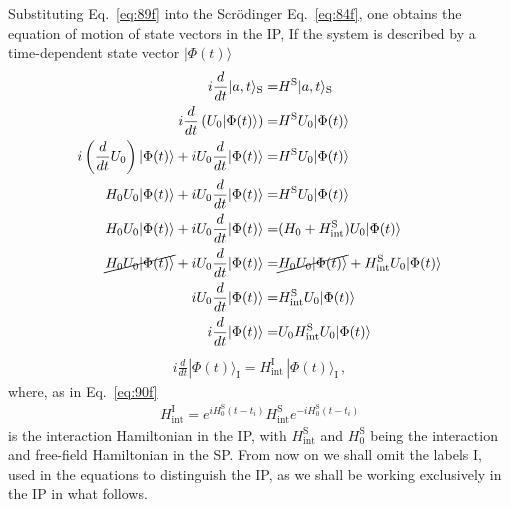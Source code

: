 Substituting Eq.~\eqref{eq:89f} into the Scr\"odinger Eq.~\eqref{eq:84f}, one obtains the equation of motion of state vectors in the IP, If the system is described by a time-dependent state vector $|\Phi(t)\rangle$
\begin{align}
  i\frac{d}{dt}|a,t\rangle_{\text{S}}=&  H^{\text{S}}|a,t\rangle_{\text{S}}\nonumber\\
  i\frac{d}{dt}\left(U_0|\Phi(t)\rangle\right)=&  H^{\text{S}}U_0|\Phi(t)\rangle\nonumber\\
  i\left(\frac{d}{dt}U_0\right)|\Phi(t)\rangle+iU_0\frac{d}{dt}|\Phi(t)\rangle=&  H^{\text{S}}U_0|\Phi(t)\rangle\nonumber\\
   H_0U_0|\Phi(t)\rangle+iU_0\frac{d}{dt}|\Phi(t)\rangle=&  H^{\text{S}}U_0|\Phi(t)\rangle\nonumber\\
   H_0U_0|\Phi(t)\rangle+iU_0\frac{d}{dt}|\Phi(t)\rangle=&  (H_0+H_{\text{int}}^{\text{S}})U_0|\Phi(t)\rangle\nonumber\\
\cancel{H_0U_0|\Phi(t)\rangle}+iU_0\frac{d}{dt}|\Phi(t)\rangle=& \cancel{H_0U_0|\Phi(t)\rangle}+H_{\text{int}}^{\text{S}}U_0|\Phi(t)\rangle\nonumber\\
  iU_0\frac{d}{dt}|\Phi(t)\rangle=&  H_{\text{int}}^{\text{S}}U_0|\Phi(t)\rangle\nonumber\\
  i\frac{d}{dt}|\Phi(t)\rangle=& U_0 H_{\text{int}}^{\text{S}}U_0|\Phi(t)\rangle
\end{align}
\begin{align}
\label{eq:91f}
  i\frac{d}{d t}|\Phi(t)\rangle_{\text{I}}=H^{\text{I}}_{\text{int}}\,|\Phi(t)\rangle_{\text{I}}\,,
\end{align}
where, as in Eq.~\eqref{eq:90f}
\begin{align}
  \label{eq:92f}
  H^{\text{I}}_{\text{int}}=e^{i H_0^{{\text{S}}}(t-t_i)}H^{\text{S}}_{\text{int}} e^{-i H_0^{{\text{S}}}(t-t_i)}
\end{align}
is the interaction Hamiltonian in the IP, with $H^{\text{S}}_{\text{int}}$ and $H^{\text{S}}_0$ being the interaction and free-field Hamiltonian in the SP. From now on we shall omit the labels I, used in the equations to distinguish the IP, as we shall be working exclusively in the IP in what follows.

